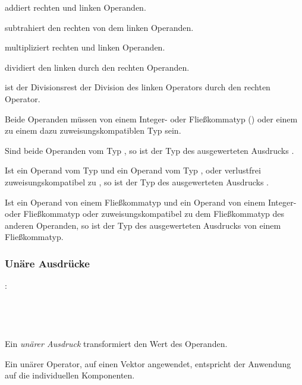 \op{\plus} addiert rechten und linken Operanden.

\op{-} subtrahiert den rechten von dem linken Operanden.

\op{*} multipliziert rechten und linken Operanden.

\op{/} dividiert den linken durch den rechten Operanden.

\op{\%} ist der Divisionsrest der Division des linken Operators durch den rechten Operator.

Beide Operanden müssen von einem Integer- oder Fließkommatyp () oder einem
zu einem dazu zuweisungskompatiblen Typ sein.

Sind beide Operanden vom Typ , so ist der Typ des ausgewerteten Ausdrucks .

Ist ein Operand vom Typ  und ein Operand vom Typ ,  oder
verlustfrei zuweisungskompatibel zu , so ist der Typ des ausgewerteten Ausdrucks .

Ist ein Operand von einem Fließkommatyp und ein Operand von einem Integer- oder Fließkommatyp
oder zuweisungskompatibel zu dem Fließkommatyp des anderen Operanden,
so ist der Typ des ausgewerteten Ausdrucks von einem Fließkommatyp.


\subsubsection{Unäre Ausdrücke}\label{Unaere Ausdruecke}
:\label{asdr_unaer}\\
\hspace*{1cm}\glq\Gt{$\sim$}\grq  {} \\
\hspace*{1cm}\glq\Gt{-}\grq  {} \\
\hspace*{1cm}\glq\Gt{!}\grq  {} \\
\hspace*{1cm} \\

Ein \emph{unärer Ausdruck} transformiert den Wert des Operanden.

Ein unärer Operator, auf einen Vektor angewendet, entspricht der Anwendung auf die individuellen Komponenten.

